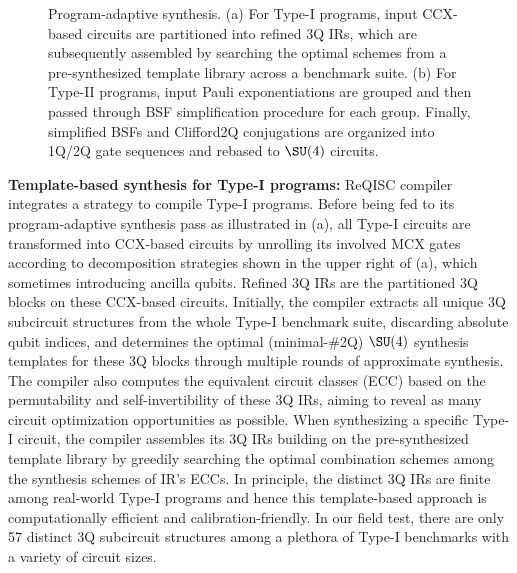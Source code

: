 \begin{figure}[tbp]
    \centering
    \caption{Program-adaptive synthesis. (a) For Type-I programs, input $\mathrm{CCX}$-based circuits are partitioned into refined 3Q IRs, which are subsequently assembled by searching the optimal schemes from a pre-synthesized template library across a benchmark suite. (b) For Type-II programs, input Pauli exponentiations are grouped and then passed through BSF simplification procedure for each group. Finally, simplified BSFs and Clifford2Q conjugations are organized into 1Q/2Q gate sequences and rebased to $\SU(4)$ circuits.}
    \label{fig:program_adaptive}
\end{figure}


\textbf{Template-based synthesis for Type-I programs:} ReQISC compiler integrates a  strategy to compile Type-I programs. 
Before being fed to its program-adaptive synthesis pass as illustrated in  (a), all Type-I circuits are transformed into $\mathrm{CCX}$-based circuits by unrolling its involved $\mathrm{MCX}$ gates according to decomposition strategies shown in the upper right of  (a), which sometimes introducing ancilla qubits. Refined 3Q IRs are the partitioned 3Q blocks on these $\mathrm{CCX}$-based circuits. Initially, the compiler extracts all unique 3Q subcircuit structures from the whole Type-I benchmark suite, discarding absolute qubit indices, and determines the optimal (minimal-\#2Q) $\SU(4)$ synthesis templates for these 3Q blocks through multiple rounds of approximate synthesis. The compiler also computes the equivalent circuit classes (ECC) based on the permutability and self-invertibility of these 3Q IRs, aiming to reveal as many circuit optimization opportunities as possible. When synthesizing a specific Type-I circuit, the compiler assembles its 3Q IRs building on the pre-synthesized template library by greedily searching the optimal combination schemes among the synthesis schemes of IR's ECCs. In principle, the distinct 3Q IRs are finite among real-world Type-I programs and hence this template-based approach is computationally efficient and calibration-friendly. In our field test, there are only 57 distinct 3Q subcircuit structures among a plethora of Type-I benchmarks with a variety of circuit sizes.



